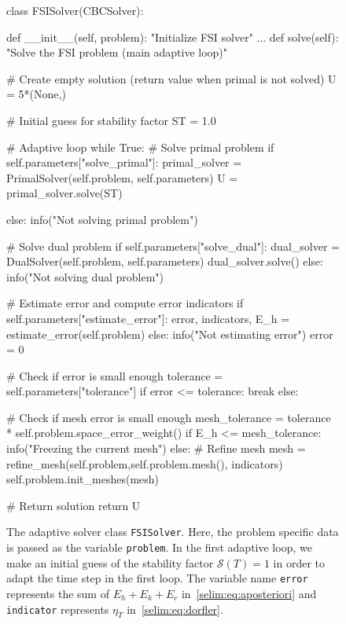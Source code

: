 \begin{figure}
\label{selim:fig:FSISolver}
\caption{The adaptive solver class \texttt{FSISolver}. Here, the
  problem specific data is passed as the variable \texttt{problem}. In
  the first adaptive loop, we make an initial guess of the stability
  factor $\mathcal{S}(T)=1$ in order to adapt the time step in the
  first loop.  The variable name \texttt{error} represents the sum of
  $E_h + E_k + E_c$ in~\eqref{selim:eq:aposteriori} and
  \texttt{indicator} represents $\eta_T$ in~\eqref{selim:eq:dorfler}.}
\begin{python}
class FSISolver(CBCSolver):

    def __init__(self, problem):
        "Initialize FSI solver"
            ...
    def solve(self):
        "Solve the FSI problem (main adaptive loop)"

        # Create empty solution (return value when primal is not solved)
        U = 5*(None,)

        # Initial guess for stability factor
        ST = 1.0

        # Adaptive loop
        while True:
            # Solve primal problem
            if self.parameters["solve_primal"]:
                primal_solver = PrimalSolver(self.problem, self.parameters)
                U = primal_solver.solve(ST)

            else:
                info("Not solving primal problem")

            # Solve dual problem
            if self.parameters["solve_dual"]:
                dual_solver = DualSolver(self.problem, self.parameters)
                dual_solver.solve()
            else:
                info("Not solving dual problem")

            # Estimate error and compute error indicators
            if self.parameters["estimate_error"]:
                error, indicators, E_h = estimate_error(self.problem)
            else:
                info("Not estimating error")
                error = 0

            # Check if error is small enough
            tolerance = self.parameters["tolerance"]
            if error <= tolerance:
                break
            else:

            # Check if mesh error is small enough
            mesh_tolerance = tolerance * self.problem.space_error_weight()
            if E_h <= mesh_tolerance:
                info("Freezing the current mesh")
            else:
                # Refine mesh
                mesh = refine_mesh(self.problem,self.problem.mesh(),
                indicators)
                self.problem.init_meshes(mesh)

        # Return solution
        return U
\end{python}
\end{figure}


